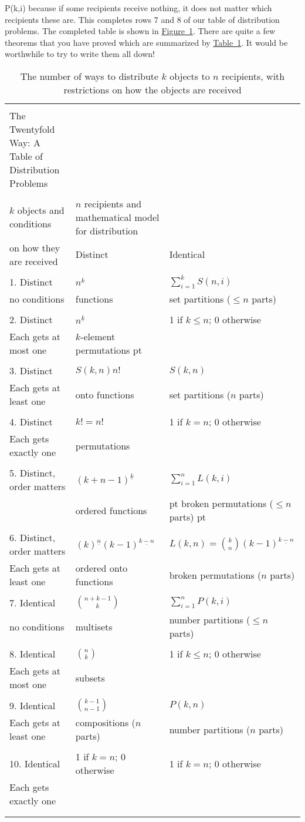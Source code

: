 \documentclass[10pt,]{book}
\theoremstyle{plain}
\theoremstyle{definition}
\numberwithin{equation}{chapter}
\newcommand{\hrulethin}  {\noalign{\hrule height 0.04em}}
\newcommand{\hrulemedium}{\noalign{\hrule height 0.07em}}
\begin{document}
P(k,i)\) because if some recipients receive nothing, it does not matter which recipients these are. This completes rows 7 and 8 of our table of distribution problems. The completed table is shown in \hyperref[lastdistributiontable]{Figure~\ref{lastdistributiontable}}. There are quite a few theorems that you have proved which are summarized by \hyperref[lastdistributiontable]{Table~\ref{lastdistributiontable}}. It would be worthwhile to try to write them all down!%
\begin{table}
\centering
\begin{tabular}{lll}
&&\tabularnewline\hrulethin
The Twentyfold Way: A Table of Distribution Problems\tabularnewline[0pt]
&&\tabularnewline\hrulemedium
\(k\) objects and conditions&\(n\) recipients and mathematical model for distribution\tabularnewline[0pt]
on how they are received&Distinct&Identical\tabularnewline[0pt]
&&\tabularnewline\hrulemedium
1.  Distinct&\(n^k\)&\(\sum_{i=1}^kS(n,i)\)\tabularnewline[0pt]
no conditions&functions&set partitions (\(\le n\) parts)\tabularnewline[0pt]
&&\tabularnewline\hrulethin
2.  Distinct&\(n^{\underline{k}}\)&1 if \(k\le n\); 0 otherwise\tabularnewline[0pt]
Each gets at most one&\kern -2pt \(k\)-element permutations\kern -2 pt&\tabularnewline[0pt]
&&\tabularnewline\hrulethin
3.  Distinct&\(S(k,n)n!\)&\(S(k,n)\)\tabularnewline[0pt]
Each gets at least one&onto functions&set partitions (\(n\) parts)\tabularnewline[0pt]
&&\tabularnewline\hrulethin
4. Distinct&\(k!=n!\)&1 if \(k=n\); 0 otherwise\tabularnewline[0pt]
Each gets exactly one&permutations&\tabularnewline[0pt]
&&\tabularnewline\hrulethin
5.  Distinct, order matters&\((k+n-1)^{\underline{k}}\)&\(\sum_{i=1}^n L(k,i)\)\tabularnewline[0pt]
&ordered functions&\hglue -3 pt broken permutations (\(\le n\) parts)\kern -3 pt\tabularnewline[0pt]
&&\tabularnewline\hrulethin
6.  Distinct, order matters&\((k)^{\underline{n}}(k-1)^{\underline{k-n}}\)&\(L(k,n)=
{ k\choose n}(k-1)^{\underline{k-n}}\)\tabularnewline[0pt]
Each gets at least one&ordered onto functions&broken permutations (\(n\) parts)\tabularnewline[0pt]
&&\tabularnewline\hrulethin
7.  Identical&\(n+k-1\choose k\)&\(\sum_{i=1}^nP(k,i)\)\tabularnewline[0pt]
no conditions&multisets&number partitions (\(\le n\) parts)\tabularnewline[0pt]
&&\tabularnewline\hrulethin
8.  Identical&\(n\choose k\)&1 if \(k\le n\); 0 otherwise\tabularnewline[0pt]
Each gets at most one&subsets&\tabularnewline[0pt]
&&\tabularnewline\hrulethin
9.  Identical&\(k-1\choose n-1\)&\(P(k,n)\)\tabularnewline[0pt]
Each gets at least one&compositions (\(n\) parts)&number partitions (\(n\) parts)\tabularnewline[0pt]
&&\tabularnewline\hrulethin
10.  Identical&1 if \(k=n\); 0 otherwise&1 if \(k=n\); 0 otherwise\tabularnewline[0pt]
Each gets exactly one&&\tabularnewline[0pt]
&&\tabularnewline\hrulethin
\end{tabular}
\caption{The number of ways to distribute \(k\) objects to \(n\) recipients, with restrictions on how the objects are received\label{lastdistributiontable}}
\end{table}
\typeout{************************************************}
\typeout{************************************************}
\end{document}
